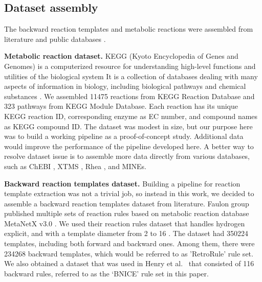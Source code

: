 \documentclass{article}
\begin{document}
\subsection{Dataset assembly}
The backward reaction templates and metabolic reactions were assembled from literature \citep{henry2010discovery, duigou2019retrorules} and public databases \citep{kanehisa2016kegg, EPFL_ATLAS, hadadi2016atlas}. 

\textbf{Metabolic reaction dataset.} KEGG (Kyoto Encyclopedia of Genes and Genomes) is a computerized resource for understanding high-level functions and utilities of the biological system \citep{kanehisa2016kegg, kanehisa1996toward, kanehisa1997database, ogata1999kegg, kanehisa2000kegg, kanehisa2002kegg, kanehisa2004kegg, kanehisa2006genomics, kanehisa2007kegg, kanehisa2010kegg, kanehisa2012kegg, kanehisa2019toward, kanehisa2019new, kanehisa2017kegg, kanehisa2014data, kanehisa2016kegg}
It is a collection of databases dealing with many aspects of information in biology, including biological pathways and chemical substances \citep{kanehisa2016kegg}. 
We assembled 11475 reactions from KEGG Reaction Database and 323 pathways from KEGG Module Database. 
Each reaction has its unique KEGG reaction ID, corresponding enzyme as EC number, and compound names as KEGG compound ID. 
The dataset was modest in size, but our purpose here was to build a working pipeline as a proof-of-concept study.
Additional data would improve the performance of the pipeline developed here. 
A better way to resolve dataset issue is to assemble more data directly from various databases, such as ChEBI \citep{chebi}, XTMS \citep{xtms}, Rhea \citep{rhea, morgat2016updates}, and MINEs. 

\textbf{Backward reaction templates dataset.}
Building a pipeline for reaction template extraction was not a trivial job, so instead in this work, we decided to assemble a backward reaction templates dataset from literature. 
Faulon group published multiple sets of reaction rules based on metabolic reaction database MetaNetX v3.0 \citep{duigou2019retrorules, metanetx, moretti2016metanetx, ganter2013metanetx, bernard2014reconciliation}. 
We used their reaction rules dataset that handles hydrogen explicit, and with a template diameter from 2 to 16 \citep{duigou2019retrorules}.
The dataset had 350224 templates, including both forward and backward ones. 
Among them, there were 234268 backward templates, which would be referred to as 'RetroRule' rule set.  
We also obtained a dataset that was used in Henry et al.\ \citep{henry2010discovery} that consisted of 116 backward rules, referred to as the `BNICE' rule set in this paper. 
\end{document}
